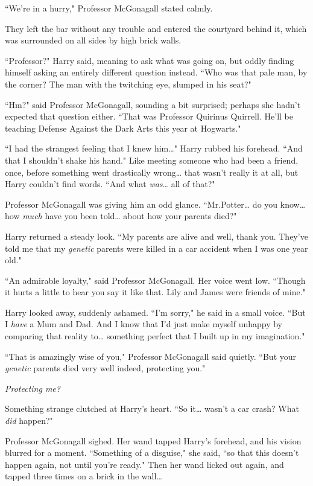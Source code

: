 ``We're in a hurry," Professor McGonagall stated calmly.

They left the bar without any trouble and entered the courtyard behind it, which was surrounded on all sides by high brick walls.

``Professor?" Harry said, meaning to ask what was going on, but oddly finding himself asking an entirely different question instead. ``Who was that pale man, by the corner? The man with the twitching eye, slumped in his seat?"

``Hm?" said Professor McGonagall, sounding a bit surprised; perhaps she hadn't expected that question either. ``That was Professor Quirinus Quirrell. He'll be teaching Defense Against the Dark Arts this year at Hogwarts."

``I had the strangest feeling that I knew him{\ldots}" Harry rubbed his forehead. ``And that I shouldn't shake his hand." Like meeting someone who had been a friend, once, before something went drastically wrong{\ldots} that wasn't really it at all, but Harry couldn't find words. ``And what \emph{was}{\ldots} all of that?"

Professor McGonagall was giving him an odd glance. ``Mr.\?Potter{\ldots} do you know{\ldots} how \emph{much} have you been told{\ldots} about how your parents died?"

Harry returned a steady look. ``My parents are alive and well, thank you. They've told me that my \emph{genetic} parents were killed in a car accident when I was one year old."

``An admirable loyalty," said Professor McGonagall. Her voice went low. ``Though it hurts a little to hear you say it like that. Lily and James were friends of mine."

Harry looked away, suddenly ashamed. ``I'm sorry," he said in a small voice. ``But I \emph{have} a Mum and Dad. And I know that I'd just make myself unhappy by comparing that reality to{\ldots} something perfect that I built up in my imagination."

``That is amazingly wise of you," Professor McGonagall said quietly. ``But your \emph{genetic} parents died very well indeed, protecting you."

\emph{Protecting me?}

Something strange clutched at Harry's heart. ``So it{\ldots} wasn't a car crash? What \emph{did} happen?"

Professor McGonagall sighed. Her wand tapped Harry's forehead, and his vision blurred for a moment. ``Something of a disguise," she said, ``so that this doesn't happen again, not until you're ready." Then her wand licked out again, and tapped three times on a brick in the wall{\ldots}

